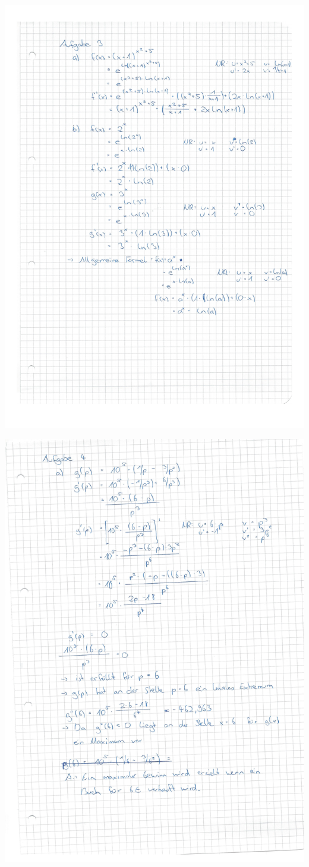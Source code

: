 \documentclass[a4paper]{scrartcl}
\begin{document}
\centerline{\includegraphics{Homework-2012-05-03-3.pdf}}

\centerline{\includegraphics{Homework-2012-05-03-4.pdf}}
\end{document}
